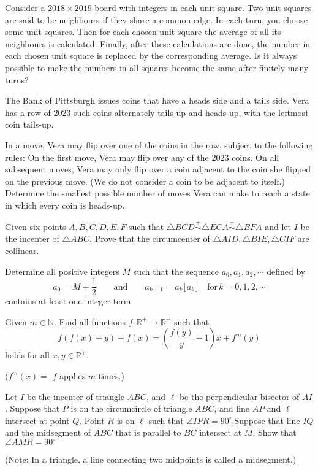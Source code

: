 \documentclass[11pt]{scrartcl}
\begin{document}
\begin{problem}[896559847059784]
	Consider a $2018 \times 2019$ board with integers in each unit square. Two unit squares are said to be neighbours if they share a common edge. In each turn, you choose some unit squares. Then for each chosen unit square the average of all its neighbours is calculated. Finally, after these calculations are done, the number in each chosen unit square is replaced by the corresponding average.
Is it always possible to make the numbers in all squares become the same after finitely many turns?
\end{problem}
\begin{problem}[899785005954032]
The Bank of Pittsburgh issues coins that have a heads side and a tails side. Vera has a row of 2023 such coins alternately tails-up and heads-up, with the leftmost coin tails-up.

In a move, Vera may flip over one of the coins in the row, subject to the following rules:
On the first move, Vera may flip over any of the $2023$ coins.
On all subsequent moves, Vera may only flip over a coin adjacent to the coin she flipped on the previous move. (We do not consider a coin to be adjacent to itself.)
Determine the smallest possible number of moves Vera can make to reach a state in which every coin is heads-up.
\end{problem}
\begin{problem}[902621191535073]
Given six points $ A, B, C, D, E, F $ such that $ \triangle BCD \stackrel{+}{\sim} \triangle ECA \stackrel{+}{\sim} \triangle BFA $ and let $ I $ be the incenter of $ \triangle ABC. $ Prove that the circumcenter of $ \triangle AID, \triangle BIE, \triangle CIF $ are collinear.
\end{problem}
\begin{problem}[905557261061260]
Determine all positive integers $M$ such that the sequence $a_0, a_1, a_2, \cdots$ defined by\[ a_0 = M + \frac{1}{2}   \qquad  \textrm{and} \qquad    a_{k+1} = a_k\lfloor a_k \rfloor   \quad \textrm{for} \, k = 0, 1, 2, \cdots \]contains at least one integer term.
\end{problem}
\begin{problem}[907873953259310]
Given $m\in\mathbb{N}$. Find all functions $f:\mathbb{R^{+}}\rightarrow\mathbb{R^{+}}$ such that$$f(f(x)+y)-f(x)=\left( \frac{f(y)}{y}-1\right)x+f^m(y)$$holds for all $x,y\in\mathbb{R^{+}}.$

($f^m(x) =$ $f$ applies $m$ times.)
\end{problem}
\begin{problem}[908587245178389]
Let $I$ be the incenter of triangle $ABC$, and $\ell$ be the perpendicular bisector of $AI$. Suppose that $P$ is on the circumcircle of triangle $ABC$, and line $AP$ and $\ell$ intersect at point $Q$. Point $R$ is on $\ell$ such that $\angle IPR = 90^{\circ}$.Suppose that line $IQ$ and the midsegment of $ABC$ that is parallel to $BC$ intersect at $M$. Show that $\angle AMR = 90^{\circ}$

(Note: In a triangle, a line connecting two midpoints is called a midsegment.)
\end{problem}
\end{document}
